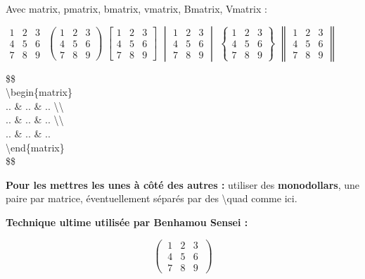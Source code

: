 \documentclass{report}
\begin{document}
Avec {\selectfont matrix, pmatrix, bmatrix, vmatrix, 	Bmatrix, Vmatrix} :

$
\begin{matrix}
1 & 2 & 3 \\
4 & 5 & 6 \\
7 & 8 & 9
\end{matrix}
$
\quad
$
\begin{pmatrix}
1 & 2 & 3 \\
4 & 5 & 6 \\
7 & 8 & 9
\end{pmatrix}
$
\quad
$
\begin{bmatrix}
1 & 2 & 3 \\
4 & 5 & 6 \\
7 & 8 & 9
\end{bmatrix}
$
\quad
$
\begin{vmatrix}
1 & 2 & 3 \\
4 & 5 & 6 \\
7 & 8 & 9
\end{vmatrix}
$
\quad
$
\begin{Bmatrix}
1 & 2 & 3 \\
4 & 5 & 6 \\
7 & 8 & 9
\end{Bmatrix}
$
\quad
$
\begin{Vmatrix}
1 & 2 & 3 \\
4 & 5 & 6 \\
7 & 8 & 9
\end{Vmatrix}
$

{\selectfont
\$\$ \\
\textbackslash{}begin\{matrix\} \\
.. \& .. \& .. \textbackslash{}\textbackslash{} \\
.. \& .. \& .. \textbackslash{}\textbackslash{} \\
.. \& .. \& .. \\
\textbackslash{}end\{matrix\} \\
\$\$
} 
\bigskip

\textbf{Pour les mettres les unes à côté des autres :} utiliser des \textbf{monodollars}, une paire par matrice, éventuellement séparés par des {\selectfont \textbackslash{}quad} comme ici.

\textbf{Technique ultime utilisée par Benhamou Sensei :}

$$ \left( \: \begin{matrix} 1 & 2 & 3 \\ 4 & 5 & 6 \\ 7 & 8 & 9 \end{matrix} \: \right) $$
\end{document}

